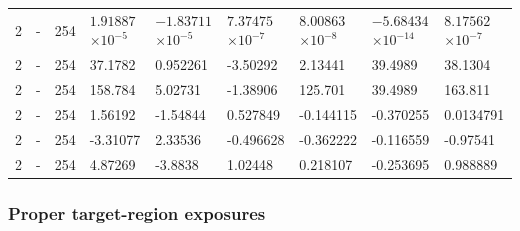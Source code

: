 \begin{longtable}
{}2 & \allowbreak{}-\allowbreak{} & 254 &  &  &  &  &  &  \\
{}2 & \allowbreak{}-\allowbreak{} & 254 & 37.1782 & 0.952261 & -3.50292 & 2.13441 & 39.4989 & 38.1304 \\
{}2 & \allowbreak{}-\allowbreak{} & 254 & 158.784 & 5.02731 & -1.38906 & 125.701 & 39.4989 & 163.811 \\
{}2 & \allowbreak{}-\allowbreak{} & 254 & 1.56192 & -1.54844 & 0.527849 & -0.144115 & -0.370255 & 0.0134791 \\
{}2 & - & 254 & -3.31077 & 2.33536 & -0.496628 & -0.362222 & -0.116559 & -0.97541 \\
{}2 & \allowbreak{}-\allowbreak{} & 254 & 4.87269 & -3.8838 & 1.02448 & 0.218107 & -0.253695 & 0.988889 \\
\end{longtable}\endgroup

\subsubsection{Proper target-region exposures}

